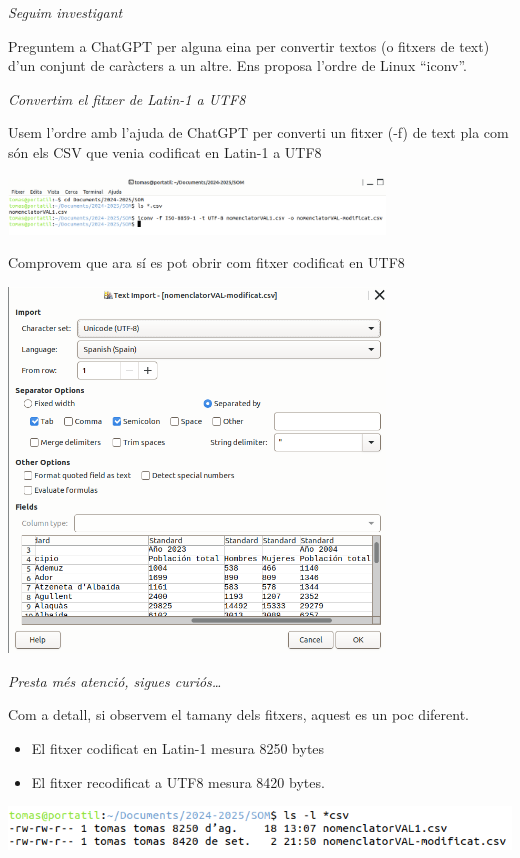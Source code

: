 \documentclass[
  12 pt,
  a4paper,
]{article}
\providecommand{\tightlist}{%
  \setlength{\itemsep}{0pt}\setlength{\parskip}{0pt}}
\begin{document}
\emph{Seguim investigant}

Preguntem a ChatGPT per alguna eina per convertir textos (o fitxers de
text) d'un conjunt de caràcters a un altre. Ens proposa l'ordre de Linux
``iconv''.

\emph{Convertim el fitxer de Latin-1 a UTF8}

Usem l'ordre amb l'ajuda de ChatGPT per converti un fitxer (-f) de text
pla com són els CSV que venia codificat en Latin-1 a UTF8

\includegraphics[width=0.75\textwidth,height=\textheight]{png/iconv.png}

Comprovem que ara sí es pot obrir com fitxer codificat en UTF8

\includegraphics[width=0.75\textwidth,height=\textheight]{png/csv3.png}

\emph{Presta més atenció, sigues curiós\ldots{}}

Com a detall, si observem el tamany dels fitxers, aquest es un poc
diferent.

\begin{itemize}
\tightlist
\item
  El fitxer codificat en Latin-1 mesura 8250 bytes
\item
  El fitxer recodificat a UTF8 mesura 8420 bytes.
\end{itemize}

\includegraphics{recursos/ls.png}
\end{document}
